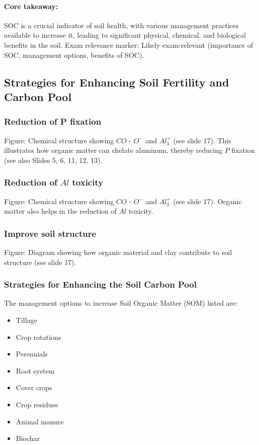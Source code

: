 \paragraph*{Core takeaway:} 
SOC is a crucial indicator of soil health, with various management practices available to increase it, leading to significant physical, chemical, and biological benefits in the soil. Exam relevance marker: Likely exam-relevant (importance of SOC, management options, benefits of SOC).

\subsection{Strategies for Enhancing Soil Fertility and Carbon Pool} 
\subsubsection{Reduction of P fixation} 
Figure: Chemical structure showing $CO$ - $O^-$ and $Al_3^+$ (see slide 17). This illustrates how organic matter can chelate aluminum, thereby reducing $P$ fixation (see also Slides 5, 6, 11, 12, 13).

\subsubsection{Reduction of $Al$ toxicity} 
Figure: Chemical structure showing $CO$ - $O^-$ and $Al_3^+$ (see slide 17). Organic matter also helps in the reduction of $Al$ toxicity.

\subsubsection{Improve soil structure} 
Figure: Diagram showing how organic material and clay contribute to soil structure (see slide 17).

\subsubsection{Strategies for Enhancing the Soil Carbon Pool} 
The management options to increase Soil Organic Matter (SOM) listed are: 

\begin{itemize} 
    \item Tillage 
    \item Crop rotations 
    \item Perennials 
    \item Root system 
    \item Cover crops 
    \item Crop residues 
    \item Animal manure 
    \item Biochar 
\end{itemize}

